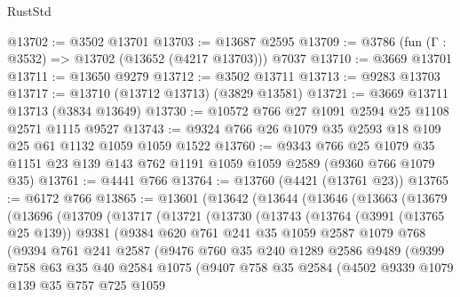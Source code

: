 \begin{lexlean}{RustStd}
\begin{coremodule}
@13702 := @3502 @13701
@13703 := @13687 @2595
@13709 := @3786 (fun (Γ : @3532) => @13702 (@13652 (@4217 @13703))) @7037
@13710 := @3669 @13701
@13711 := @13650 @9279
@13712 := @3502 @13711
@13713 := @9283 @13703
@13717 := @13710 (@13712 @13713) (@3829 @13581)
@13721 := @3669 @13711 @13713 (@3834 @13649)
@13730 := @10572 @766 @27 @1091 @2594 @25 @1108 @2571 @1115 @9527
@13743 := @9324 @766 @26 @1079 @35 @2593 @18 @109 @25 @61 @1132 @1059 @1059 @1522
@13760 := @9343
    @766
    @25
    @1079
    @35
    @1151
    @23
    @139
    @143
    @762
    @1191
    @1059
    @1059
    @2589
    (@9360 @766 @1079 @35)
@13761 := @4441 @766
@13764 := @13760 (@4421 (@13761 @23))
@13765 := @6172 @766
@13865 := @13601
    (@13642
      (@13644
        (@13646
          (@13663
            (@13679
              (@13696
                (@13709
                  (@13717
                    (@13721
                      (@13730
                        (@13743
                          (@13764
                            (@3991 (@13765 @25 @139))
                            @9381
                            (@9384
                              @620
                              @761
                              @241
                              @35
                              @1059
                              @2587
                              @1079
                              @768
                              (@9394
                                @761
                                @241
                                @2587
                                (@9476
                                  @760
                                  @35
                                  @240
                                  @1289
                                  @2586
                                  @9489
                                  (@9399
                                    @758
                                    @63
                                    @35
                                    @40
                                    @2584
                                    @1075
                                    (@9407
                                      @758
                                      @35
                                      @2584
                                      (@4502
                                        @9339
                                        @1079
                                        @139
                                        @35
                                        @757
                                        @725
                                        @1059

\end{coremodule}
\end{lexlean}
